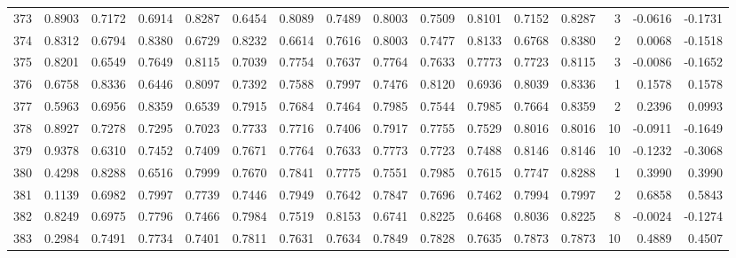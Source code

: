 \begin{tabular}{lrrrrrrrrrrrrrrr}
373 &      0.8903 &  0.7172 &  0.6914 &  0.8287 &  0.6454 &  0.8089 &  0.7489 &  0.8003 &  0.7509 &  0.8101 &   0.7152 &     0.8287 &      3 &                   -0.0616 &                    -0.1731 \\
374 &      0.8312 &  0.6794 &  0.8380 &  0.6729 &  0.8232 &  0.6614 &  0.7616 &  0.8003 &  0.7477 &  0.8133 &   0.6768 &     0.8380 &      2 &                    0.0068 &                    -0.1518 \\
375 &      0.8201 &  0.6549 &  0.7649 &  0.8115 &  0.7039 &  0.7754 &  0.7637 &  0.7764 &  0.7633 &  0.7773 &   0.7723 &     0.8115 &      3 &                   -0.0086 &                    -0.1652 \\
376 &      0.6758 &  0.8336 &  0.6446 &  0.8097 &  0.7392 &  0.7588 &  0.7997 &  0.7476 &  0.8120 &  0.6936 &   0.8039 &     0.8336 &      1 &                    0.1578 &                     0.1578 \\
377 &      0.5963 &  0.6956 &  0.8359 &  0.6539 &  0.7915 &  0.7684 &  0.7464 &  0.7985 &  0.7544 &  0.7985 &   0.7664 &     0.8359 &      2 &                    0.2396 &                     0.0993 \\
378 &      0.8927 &  0.7278 &  0.7295 &  0.7023 &  0.7733 &  0.7716 &  0.7406 &  0.7917 &  0.7755 &  0.7529 &   0.8016 &     0.8016 &     10 &                   -0.0911 &                    -0.1649 \\
379 &      0.9378 &  0.6310 &  0.7452 &  0.7409 &  0.7671 &  0.7764 &  0.7633 &  0.7773 &  0.7723 &  0.7488 &   0.8146 &     0.8146 &     10 &                   -0.1232 &                    -0.3068 \\
380 &      0.4298 &  0.8288 &  0.6516 &  0.7999 &  0.7670 &  0.7841 &  0.7775 &  0.7551 &  0.7985 &  0.7615 &   0.7747 &     0.8288 &      1 &                    0.3990 &                     0.3990 \\
381 &      0.1139 &  0.6982 &  0.7997 &  0.7739 &  0.7446 &  0.7949 &  0.7642 &  0.7847 &  0.7696 &  0.7462 &   0.7994 &     0.7997 &      2 &                    0.6858 &                     0.5843 \\
382 &      0.8249 &  0.6975 &  0.7796 &  0.7466 &  0.7984 &  0.7519 &  0.8153 &  0.6741 &  0.8225 &  0.6468 &   0.8036 &     0.8225 &      8 &                   -0.0024 &                    -0.1274 \\
383 &      0.2984 &  0.7491 &  0.7734 &  0.7401 &  0.7811 &  0.7631 &  0.7634 &  0.7849 &  0.7828 &  0.7635 &   0.7873 &     0.7873 &     10 &                    0.4889 &                     0.4507 \\

\end{tabular}
